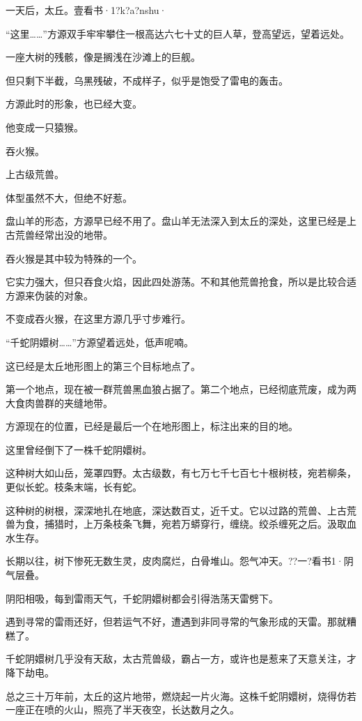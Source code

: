 
\begin{this_body}

一天后，太丘。壹看书·1?k?a?nshu·

“这里……”方源双手牢牢攀住一根高达六七十丈的巨人草，登高望远，望着远处。

一座大树的残骸，像是搁浅在沙滩上的巨舰。

但只剩下半截，乌黑残破，不成样子，似乎是饱受了雷电的轰击。

方源此时的形象，也已经大变。

他变成一只猿猴。

吞火猴。

上古级荒兽。

体型虽然不大，但绝不好惹。

盘山羊的形态，方源早已经不用了。盘山羊无法深入到太丘的深处，这里已经是上古荒兽经常出没的地带。

吞火猴是其中较为特殊的一个。

它实力强大，但只吞食火焰，因此四处游荡。不和其他荒兽抢食，所以是比较合适方源来伪装的对象。

不变成吞火猴，在这里方源几乎寸步难行。

“千蛇阴嬛树……”方源望着远处，低声呢喃。

这已经是太丘地形图上的第三个目标地点了。

第一个地点，现在被一群荒兽黑血狼占据了。第二个地点，已经彻底荒废，成为两大食肉兽群的夹缝地带。

方源现在的位置，已经是最后一个在地形图上，标注出来的目的地。

这里曾经倒下了一株千蛇阴嬛树。

这种树大如山岳，笼罩四野。太古级数，有七万七千七百七十根树枝，宛若柳条，更似长蛇。枝条末端，长有蛇。

这种树的树根，深深地扎在地底，深达数百丈，近千丈。它以过路的荒兽、上古荒兽为食，捕猎时，上万条枝条飞舞，宛若万蟒穿行，缠绕。绞杀缠死之后。汲取血水生存。

长期以往，树下惨死无数生灵，皮肉腐烂，白骨堆山。怨气冲天。??一?看书1·阴气层叠。

阴阳相吸，每到雷雨天气，千蛇阴嬛树都会引得浩荡天雷劈下。

遇到寻常的雷雨还好，但若运气不好，遭遇到非同寻常的气象形成的天雷。那就糟糕了。

千蛇阴嬛树几乎没有天敌，太古荒兽级，霸占一方，或许也是惹来了天意关注，才降下劫电。

总之三十万年前，太丘的这片地带，燃烧起一片火海。这株千蛇阴嬛树，烧得仿若一座正在喷的火山，照亮了半天夜空，长达数月之久。


\end{this_body}
